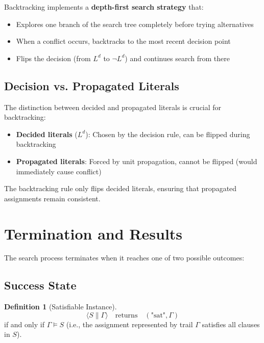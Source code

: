 \documentclass[11pt,a4paper]{article}
\theoremstyle{definition}
\newtheorem{definition}{Definition}[section]
\theoremstyle{plain}
\theoremstyle{remark}
\begin{document}
Backtracking implements a \textbf{depth-first search strategy} that:
\begin{itemize}
    \item Explores one branch of the search tree completely before trying alternatives
    \item When a conflict occurs, backtracks to the most recent decision point
    \item Flips the decision (from $L^d$ to $\neg L^d$) and continues search from there
\end{itemize}

\subsection{Decision vs. Propagated Literals}

The distinction between decided and propagated literals is crucial for backtracking:

\begin{itemize}
    \item \textbf{Decided literals} ($L^d$): Chosen by the decision rule, can be flipped during backtracking
    \item \textbf{Propagated literals}: Forced by unit propagation, cannot be flipped (would immediately cause conflict)
\end{itemize}

The backtracking rule only flips decided literals, ensuring that propagated assignments remain consistent.

\section{Termination and Results}

The search process terminates when it reaches one of two possible outcomes:

\subsection{Success State}

\begin{tcolorbox}[colback=green!5!white,colframe=green!75!black,title=\textbf{Success Condition}]
\begin{definition}[Satisfiable Instance]
\[
\langle S \parallel \varGamma \rangle \quad \text{returns} \quad (\text{"sat"}, \varGamma)
\]
if and only if $\varGamma \models S$ (i.e., the assignment represented by trail $\varGamma$ satisfies all clauses in $S$).
\end{definition}
\end{tcolorbox}
\end{document}
